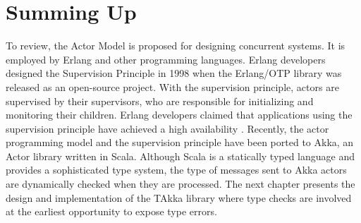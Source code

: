 





\section{Summing Up}

To review, the Actor Model \citep{Hewitt:1973} is proposed for designing 
concurrent systems. It is employed by Erlang  \citep{ArmstrongErlang} and other 
programming languages. Erlang developers designed the Supervision Principle in 
1998 when the Erlang/OTP library was released as an open-source project.  With 
the supervision principle, actors are supervised by their supervisors, who are 
responsible for initializing and monitoring their children.  Erlang developers 
claimed that applications using the supervision principle have achieved a 
high availability \citep{ArmstrongAXD}. Recently, the actor programming model 
and the supervision principle have been ported to Akka, an Actor library 
written in Scala.  Although Scala is a statically typed language and provides a 
sophisticated type system, the type of messages sent to Akka actors are 
dynamically checked when they are processed.  The next chapter presents the 
design and implementation of the TAkka library where type checks are involved
at the earliest opportunity to expose type errors.




